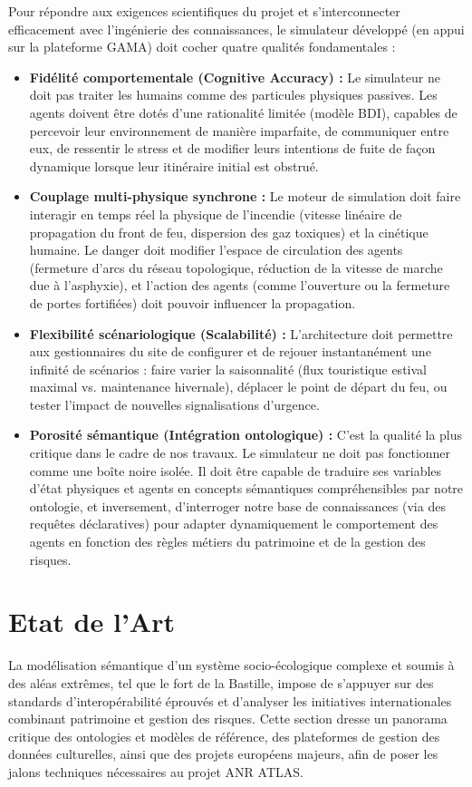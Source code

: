 \documentclass{article}
\begin{document}
Pour répondre aux exigences scientifiques du projet et s'interconnecter efficacement avec l'ingénierie des connaissances, le simulateur développé (en appui sur la plateforme GAMA) doit cocher quatre qualités fondamentales :

\begin{itemize}
    \item \textbf{Fidélité comportementale (Cognitive Accuracy) :} Le simulateur ne doit pas traiter les humains comme des particules physiques passives. Les agents doivent être dotés d'une rationalité limitée (modèle BDI), capables de percevoir leur environnement de manière imparfaite, de communiquer entre eux, de ressentir le stress et de modifier leurs intentions de fuite de façon dynamique lorsque leur itinéraire initial est obstrué.
    \item \textbf{Couplage multi-physique synchrone :} Le moteur de simulation doit faire interagir en temps réel la physique de l'incendie (vitesse linéaire de propagation du front de feu, dispersion des gaz toxiques) et la cinétique humaine. Le danger doit modifier l'espace de circulation des agents (fermeture d'arcs du réseau topologique, réduction de la vitesse de marche due à l'asphyxie), et l'action des agents (comme l'ouverture ou la fermeture de portes fortifiées) doit pouvoir influencer la propagation.
    \item \textbf{Flexibilité scénariologique (Scalabilité) :} L'architecture doit permettre aux gestionnaires du site de configurer et de rejouer instantanément une infinité de scénarios : faire varier la saisonnalité (flux touristique estival maximal vs. maintenance hivernale), déplacer le point de départ du feu, ou tester l'impact de nouvelles signalisations d'urgence.
    \item \textbf{Porosité sémantique (Intégration ontologique) :} C'est la qualité la plus critique dans le cadre de nos travaux. Le simulateur ne doit pas fonctionner comme une boîte noire isolée. Il doit être capable de traduire ses variables d'état physiques et agents en concepts sémantiques compréhensibles par notre ontologie, et inversement, d'interroger notre base de connaissances (via des requêtes déclaratives) pour adapter dynamiquement le comportement des agents en fonction des règles métiers du patrimoine et de la gestion des risques.
\end{itemize}

\clearpage
\section{Etat de l'Art}
La modélisation sémantique d'un système socio-écologique complexe et soumis à des aléas extrêmes, tel que le fort de la Bastille, impose de s'appuyer sur des standards d'interopérabilité éprouvés et d'analyser les initiatives internationales combinant patrimoine et gestion des risques. Cette section dresse un panorama critique des ontologies et modèles de référence, des plateformes de gestion des données culturelles, ainsi que des projets européens majeurs, afin de poser les jalons techniques nécessaires au projet ANR ATLAS.
\end{document}
